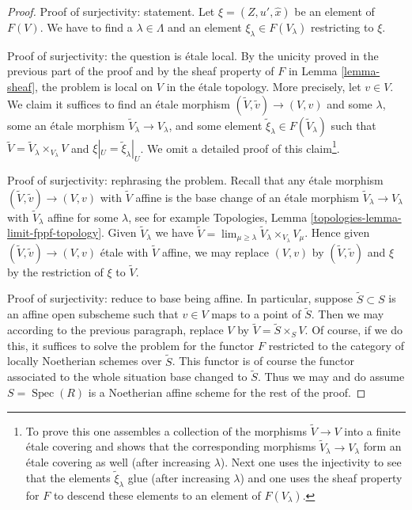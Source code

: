 \documentclass[10pt,a4paper]{amsart}
\theoremstyle{plain}
\theoremstyle{definition}
\theoremstyle{remark}
\numberwithin{equation}{subsection}
\def\lim{\mathop{\mathrm{lim}}\nolimits}
\def\Spec{\mathop{\mathrm{Spec}}}
\begin{document}
\begin{proof}
\medskip\noindent
Proof of surjectivity: statement.
Let $\xi = (Z, u', \hat x)$ be an element of $F(V)$.
We have to find a $\lambda \in \Lambda$ and an element
$\xi_\lambda \in F(V_\lambda)$ restricting to $\xi$.

\medskip\noindent
Proof of surjectivity: the question is \'etale local.
By the unicity proved in the previous part of the proof and by the
sheaf property of $F$ in Lemma \ref{lemma-sheaf}, the problem
is local on $V$ in the \'etale topology. More precisely, let $v \in V$.
We claim it suffices to find an \'etale morphism
$(\tilde V, \tilde v) \to (V, v)$ and some
$\lambda$, some an \'etale morphism $\tilde V_\lambda \to V_\lambda$,
and some element $\tilde \xi_\lambda \in F(\tilde V_\lambda)$ such that
$\tilde V = \tilde V_\lambda \times_{V_\lambda} V$
and $\xi|_U = \tilde \xi_\lambda|_U$. We omit a detailed proof of
this claim\footnote{To prove this
one assembles a collection of the morphisms $\tilde V \to V$
into a finite \'etale covering and shows that the corresponding morphisms
$\tilde V_\lambda \to V_\lambda$ form an \'etale covering as well (after
increasing $\lambda$). Next one uses the injectivity to see that
the elements $\tilde \xi_\lambda$ glue (after increasing $\lambda$)
and one uses the sheaf property for $F$ to descend these
elements to an element of $F(V_\lambda)$.}.

\medskip\noindent
Proof of surjectivity: rephrasing the problem.
Recall that any \'etale morphism $(\tilde V, \tilde v) \to (V, v)$
with $\tilde V$ affine is the base change of an \'etale morphism
$\tilde V_\lambda \to V_\lambda$ with $\tilde V_\lambda$ affine
for some $\lambda$, see for example
Topologies, Lemma \ref{topologies-lemma-limit-fppf-topology}.
Given $\tilde V_\lambda$ we have
$\tilde V = \lim_{\mu \geq \lambda} \tilde V_\lambda \times_{V_\lambda} V_\mu$.
Hence given $(\tilde V, \tilde v) \to (V, v)$ \'etale with $\tilde V$ affine,
we may replace $(V, v)$ by $(\tilde V, \tilde v)$ and $\xi$ by
the restriction of $\xi$ to $\tilde V$.

\medskip\noindent
Proof of surjectivity: reduce to base being affine. In particular,
suppose $\tilde S \subset S$ is an affine open subscheme such
that $v \in V$ maps to a point of $\tilde S$. Then we may according
to the previous paragraph, replace $V$ by $\tilde V = \tilde S \times_S V$.
Of course, if we do this, it suffices to solve the problem
for the functor $F$ restricted to the category of locally Noetherian
schemes over $\tilde S$. This functor is of course the functor
associated to the whole situation base changed to $\tilde S$.
Thus we may and do assume $S = \Spec(R)$ is a Noetherian affine scheme
for the rest of the proof.


\end{proof}
\end{document}
